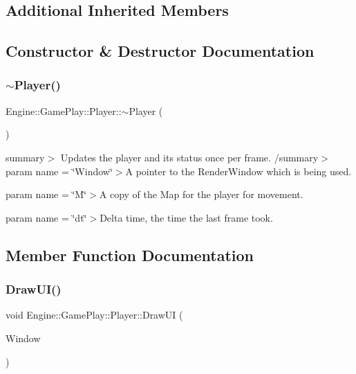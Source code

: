 \subsection*{Additional Inherited Members}


\subsection{Constructor \& Destructor Documentation}
\mbox{\label{class_engine_1_1_game_play_1_1_player_a39c82fa94afe71949a7fff50fed2a4d0}} 
\subsubsection{\texorpdfstring{$\sim$\+Player()}{~Player()}}
{\footnotesize\ttfamily Engine\+::\+Game\+Play\+::\+Player\+::$\sim$\+Player (\begin{DoxyParamCaption}{ }\end{DoxyParamCaption})}

summary$>$ Updates the player and its status once per frame. /summary$>$ param name = \char`\"{}\+Window\char`\"{}$>$A pointer to the Render\+Window which is being used.

param name = \char`\"{}\+M\char`\"{}$>$A copy of the Map for the player for movement.

param name = \char`\"{}dt\char`\"{}$>$Delta time, the time the last frame took.

\subsection{Member Function Documentation}
\mbox{\label{class_engine_1_1_game_play_1_1_player_a4b3e08479cfc81c66eadf1e9da4a47fe}} 
\subsubsection{\texorpdfstring{Draw\+U\+I()}{DrawUI()}}
{\footnotesize\ttfamily void Engine\+::\+Game\+Play\+::\+Player\+::\+Draw\+UI (\begin{DoxyParamCaption}\item[{Render\+Window $\ast$}]{Window }\end{DoxyParamCaption})}

